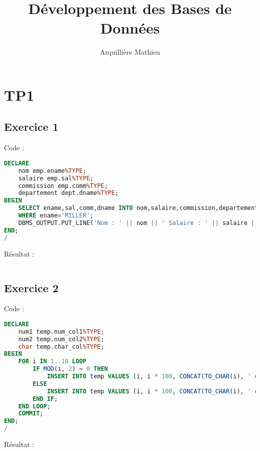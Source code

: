 \documentclass{article}
\title{Développement des Bases de Données}
\author{Arquillière Mathieu}
\begin{document}
\begin{titlepage}
  \maketitle
\end{titlepage}

\newpage

\section{TP1}

\subsection{Exercice 1}
Code :
\begin{lstlisting}[language=SQL,
    morekeywords={DECLARE, LOOP, TYPE, FOR, IF, IS, OPEN, FETCH, DBMS_OUTPUT, PUT_LINE}]
DECLARE
    nom emp.ename%TYPE;
    salaire emp.sal%TYPE;
    commission emp.comm%TYPE;
    departement dept.dname%TYPE;
BEGIN 
    SELECT ename,sal,comm,dname INTO nom,salaire,commission,departement FROM Emp NATURAL JOIN Dept
    WHERE ename='MILLER';
    DBMS_OUTPUT.PUT_LINE('Nom : ' || nom || ' Salaire : ' || salaire || ' Commission : ' || commission || 'Departement : ' || departement);
END;
/
\end{lstlisting}

Résultat :
\begin{lstlisting}[language=SQL,
    morekeywords={DECLARE, LOOP, TYPE, FOR, IF, IS, OPEN, FETCH, DBMS_OUTPUT, PUT_LINE}]
\end{lstlisting}

\subsection{Exercice 2}
Code :
\begin{lstlisting}[language=SQL,
    deletekeywords={char},
    morekeywords={DECLARE, LOOP, TYPE, FOR, IF, IS, OPEN, FETCH, DBMS_OUTPUT, PUT_LINE}]
DECLARE
    num1 temp.num_col1%TYPE;
    num2 temp.num_col2%TYPE;
    char temp.char_col%TYPE;
BEGIN
	FOR i IN 1..10 LOOP
		IF MOD(i, 2) = 0 THEN
			INSERT INTO temp VALUES (i, i * 100, CONCAT(TO_CHAR(i), ' est pair'));
		ELSE
			INSERT INTO temp VALUES (i, i * 100, CONCAT(TO_CHAR(i), ' est impair'));
		END IF;
	END LOOP;
	COMMIT;
END;
/
\end{lstlisting}

Résultat :
\begin{lstlisting}[language=SQL,
    morekeywords={DECLARE, LOOP, TYPE, FOR, IF, IS, OPEN, FETCH, DBMS_OUTPUT, PUT_LINE}]
\end{lstlisting}
\end{document}
